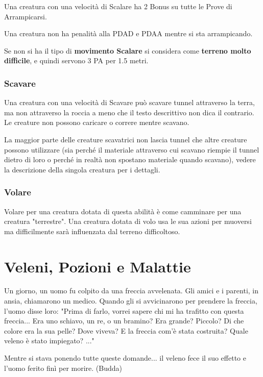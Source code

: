 \documentclass[12pt,a4paper,twoside,openany]{book}
\begin{document}
\begin{multicols}{2}
Una creatura con una velocità di Scalare ha 2 Bonus su tutte le Prove di Arrampicarsi. 

Una creatura non ha penalità alla PDAD e PDAA mentre si sta arrampicando.

Se non si ha il tipo di \textbf{movimento Scalare} si considera come \textbf{terreno molto difficile}, e quindi servono 3 PA per 1.5 metri.

\subsubsection{Scavare}\label{scavare}

Una creatura con una velocità di Scavare può scavare tunnel attraverso la terra, ma non attraverso la roccia a meno che il testo descrittivo non dica il contrario. Le creature non possono caricare o correre mentre scavano.

La maggior parte delle creature scavatrici non lascia tunnel che altre creature possono utilizzare (sia perché il materiale attraverso cui scavano riempie il tunnel dietro di loro o perché in realtà non spostano materiale quando scavano), vedere la descrizione della singola creatura per i dettagli.

\subsubsection{Volare}\label{volare}

Volare per una creatura dotata di questa abilità è come camminare per una creatura "terrestre". Una creatura dotata di volo usa le sua azioni per muoversi ma difficilmente sarà influenzata dal terreno difficoltoso.

\end{multicols}

\pagebreak
\section{Veleni, Pozioni e Malattie}

\label{veleni-e-pozioni}


\begin{changemargin}{0.3cm}{0.3cm}\begin{enfasi}{
Un giorno, un uomo fu colpito da una freccia avvelenata. Gli amici e i parenti, in ansia, chiamarono un medico. Quando gli si avvicinarono per prendere la freccia, l'uomo disse loro: "Prima di farlo, vorrei sapere chi mi ha trafitto con questa freccia... Era uno schiavo, un re, o un bramino? Era grande? Piccolo? Di che colore era la sua pelle? Dove viveva? E la freccia com'è stata costruita? Quale veleno è stato impiegato? ..."

Mentre si stava ponendo tutte queste domande... il veleno fece il suo effetto e l'uomo ferito finì per morire. (Budda)}\end{enfasi}\end{changemargin}\medskip
\end{document}
